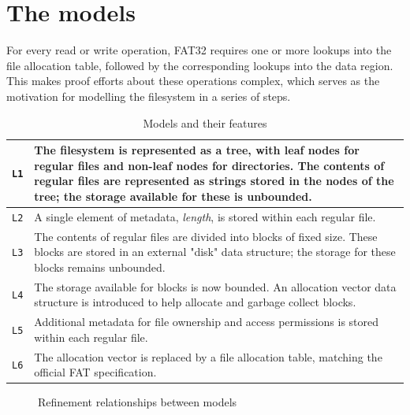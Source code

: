 \documentclass[runningheads,a4paper]{llncs}
\begin{document}
\section{The models}

For every read or write operation, FAT32 requires one or more lookups
into the file allocation table, followed by the corresponding lookups
into the data region. This makes proof efforts about these operations
complex, which serves as the motivation for modelling the filesystem
in a series of steps.

\begin{table}[]
  \centering
  \caption{Models and their features}
  \label{model-description-table}
  \begin{tabular}{|l|p{120mm}|}
    \hline
    \texttt{L1} & The filesystem is represented as a tree, with leaf
    nodes for regular files and non-leaf nodes for
    directories. The contents of regular files are represented as
    strings stored in the nodes of the tree; the storage available for
    these is unbounded. \\ \hline
    \texttt{L2} & A single element of metadata, \textit{length}, is
    stored within each regular file.  \\ \hline
    \texttt{L3} & The contents of regular files are divided into
    blocks of fixed size. These blocks are stored in an external
    "disk" data structure; the storage for these blocks remains
    unbounded. \\ \hline
    \texttt{L4} & The storage available for blocks is now bounded. An
    allocation vector data structure is introduced to help allocate
    and garbage collect blocks. \\ \hline
    \texttt{L5} & Additional metadata for file ownership and access
    permissions is stored within each regular file. \\ \hline
    \texttt{L6} & The allocation vector is replaced by a file
    allocation table, matching the official FAT specification. \\ \hline
  \end{tabular}
\end{table}

\begin{figure}
  \centering
  \caption{Refinement relationships between models}
  \label{refinement-figure}
\end{figure}
\end{document}
